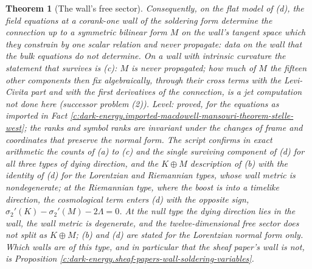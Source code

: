 \documentclass[11pt]{article}
\newtheorem{theorem}{Theorem}[section]
\theoremstyle{definition}
\theoremstyle{plain}
\begin{document}
\begin{theorem}[The wall's free sector]
Consequently, on the flat model of (d), the field equations at a corank-one wall of the soldering form determine the connection up to a symmetric bilinear form $M$ on the wall's tangent space which they constrain by one scalar relation and never propagate: data on the wall that the bulk equations do not determine. On a wall with intrinsic curvature the statement that survives is (c): $M$ is never propagated; how much of $M$ the fifteen other components then fix algebraically, through their cross terms with the Levi-Civita part and with the first derivatives of the connection, is a jet computation not done here (successor problem (2)). \emph{Level:} proved, for the equations as imported in Fact \ref{c:dark-energy.imported-macdowell-mansouri-theorem-stelle-west}; the ranks and symbol ranks are invariant under the changes of frame and coordinates that preserve the normal form. The script confirms in exact arithmetic the counts of (a) to (c) and the single surviving component of (d) for all three types of dying direction, and the $K \oplus M$ description of (b) with the identity of (d) for the Lorentzian and Riemannian types, whose wall metric is nondegenerate; at the Riemannian type, where the boost is into a timelike direction, the cosmological term enters (d) with the opposite sign, $\sigma_2'(K) - \sigma_2'(M) - 2\Lambda = 0$. At the null type the dying direction lies in the wall, the wall metric is degenerate, and the twelve-dimensional free sector does not split as $K \oplus M$; (b) and (d) are stated for the Lorentzian normal form only. Which walls are of this type, and in particular that the sheaf paper's wall is not, is Proposition \ref{c:dark-energy.sheaf-papers-wall-soldering-variables}.
\end{theorem}
\end{document}
